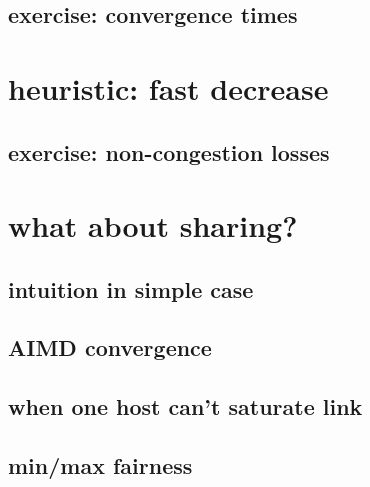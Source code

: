\subsection{exercise: convergence times}



\section{heuristic: fast decrease}



\subsection{exercise: non-congestion losses}



\section{what about sharing?}


\subsection{intuition in simple case}


\subsection{AIMD convergence}


\subsection{when one host can't saturate link}


\subsection{min/max fairness}


